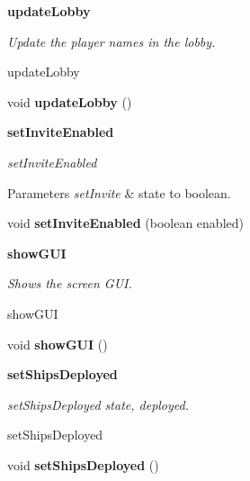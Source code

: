 \begin{Indent}{\bf update\+Lobby}\par
{\em Update the player names in the lobby.

update\+Lobby }\begin{DoxyCompactItemize}
\item 
\hypertarget{classbattleship_1_1screen_1_1Screen_ae8132ff6bf1c9d46bb7b1448fbbeb08c}{}void {\bfseries update\+Lobby} ()\label{classbattleship_1_1screen_1_1Screen_ae8132ff6bf1c9d46bb7b1448fbbeb08c}

\end{DoxyCompactItemize}
\end{Indent}
\begin{Indent}{\bf set\+Invite\+Enabled}\par
{\em set\+Invite\+Enabled


\begin{DoxyParams}{Parameters}
{\em set\+Invite} & state to boolean. \\
\hline
\end{DoxyParams}
}\begin{DoxyCompactItemize}
\item 
\hypertarget{classbattleship_1_1screen_1_1Screen_a2ed787dffdc0254e82f1edfe2278b4f8}{}void {\bfseries set\+Invite\+Enabled} (boolean enabled)\label{classbattleship_1_1screen_1_1Screen_a2ed787dffdc0254e82f1edfe2278b4f8}

\end{DoxyCompactItemize}
\end{Indent}
\begin{Indent}{\bf show\+G\+U\+I}\par
{\em Shows the screen G\+U\+I.

show\+G\+U\+I }\begin{DoxyCompactItemize}
\item 
\hypertarget{classbattleship_1_1screen_1_1Screen_a29337e778e35442575d5c02c62a47200}{}void {\bfseries show\+G\+U\+I} ()\label{classbattleship_1_1screen_1_1Screen_a29337e778e35442575d5c02c62a47200}

\end{DoxyCompactItemize}
\end{Indent}
\begin{Indent}{\bf set\+Ships\+Deployed}\par
{\em set\+Ships\+Deployed state, deployed.

set\+Ships\+Deployed }\begin{DoxyCompactItemize}
\item 
\hypertarget{classbattleship_1_1screen_1_1Screen_a9b67586d248a7ec492de4a46fc05b2e6}{}void {\bfseries set\+Ships\+Deployed} ()\label{classbattleship_1_1screen_1_1Screen_a9b67586d248a7ec492de4a46fc05b2e6}

\end{DoxyCompactItemize}
\end{Indent}


